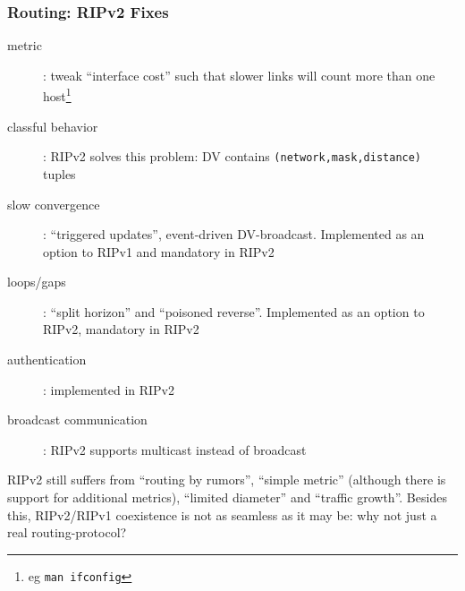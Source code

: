 \documentclass[ignorenonframetext]{beamer}
\begin{document}
\begin{frame}
\frametitle{Routing: RIPv2 Fixes}
\begin{description}
	\item[metric]: tweak ``interface cost'' such that slower links will count
		more than one host\footnote{eg {\tt man ifconfig}}
	\item[classful behavior]: RIPv2 solves this problem: DV contains {\tt 		(network,mask,distance)} tuples
	\item[slow convergence]: ``triggered updates'', event-driven DV-broadcast. Implemented
		as an option to RIPv1 and mandatory in RIPv2
	\item[loops/gaps]: ``split horizon'' and ``poisoned reverse''. Implemented as an option
		to RIPv2, mandatory in RIPv2
	\item[authentication]: implemented in RIPv2
	\item[broadcast communication]: RIPv2 supports multicast instead of broadcast
\end{description}
\begin{tiny}
RIPv2 still suffers from ``routing by rumors'', ``simple metric'' (although there is support for
additional metrics), ``limited diameter'' and ``traffic growth''. Besides this, RIPv2/RIPv1
coexistence is not as seamless as it may be: why not just a real routing-protocol\texttrademark?
\end{tiny}
\end{frame}
\end{document}
